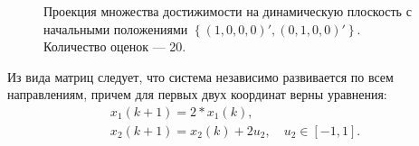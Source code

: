 \documentclass[10pt, a4paper]{article}
\begin{document}
\begin{figure}[H]
\caption{Проекция множества достижимости на динамическую плоскость с начальными положениями $\left\{(1,0,0,0)',(0,1,0,0)'\right\}$. Количество оценок --- 20.}
\end{figure}

Из вида матриц следует, что система независимо развивается по всем направлениям, причем для первых двух координат верны уравнения:
\begin{gather*}
x_1(k+1) = 2*x_1(k),\\
x_2(k+1) = x_2(k)+2u_2,\quad u_2 \in[-1,1].
\end{gather*}
\end{document}
